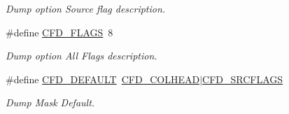 \begin{DoxyCompactItemize}
\begin{DoxyCompactList}\small\item\em Dump option Source flag description. \end{DoxyCompactList}\item 
\hypertarget{group__advanced__features_gaa336fcd58eb185bf3b5a71af12d2ba69}{\#define \hyperlink{group__advanced__features_gaa336fcd58eb185bf3b5a71af12d2ba69}{C\-F\-D\-\_\-\-F\-L\-A\-G\-S}~8}\label{group__advanced__features_gaa336fcd58eb185bf3b5a71af12d2ba69}

\begin{DoxyCompactList}\small\item\em Dump option All Flags description. \end{DoxyCompactList}\item 
\hypertarget{group__advanced__features_ga61cced010b3d926e37aafdf615951875}{\#define \hyperlink{group__advanced__features_ga61cced010b3d926e37aafdf615951875}{C\-F\-D\-\_\-\-D\-E\-F\-A\-U\-L\-T}~\hyperlink{group__advanced__features_ga05403834c7c6377bcf762d640c0d0854}{C\-F\-D\-\_\-\-C\-O\-L\-H\-E\-A\-D}$|$\hyperlink{group__advanced__features_ga9deeb100c2dc701f8f8193b8fb53fbff}{C\-F\-D\-\_\-\-S\-R\-C\-F\-L\-A\-G\-S}}\label{group__advanced__features_ga61cced010b3d926e37aafdf615951875}

\begin{DoxyCompactList}\small\item\em Dump Mask Default. \end{DoxyCompactList}\end{DoxyCompactItemize}
